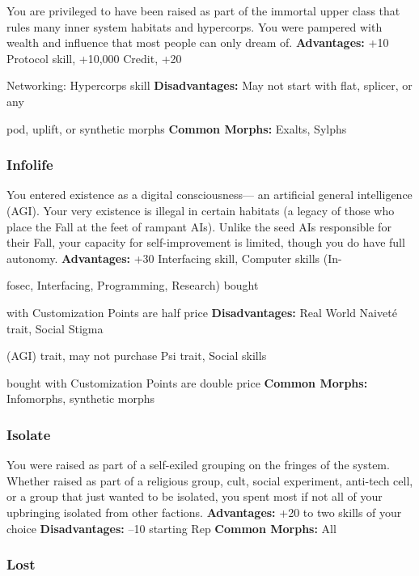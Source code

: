 You are privileged to have been raised as part of the 
immortal upper class that rules many inner system 
habitats and hypercorps. You were pampered with 
wealth and influence that most people can only 
dream of.
\textbf{Advantages:} +10 Protocol skill, +10,000 Credit, +20 

Networking: Hypercorps skill
\textbf{Disadvantages:} May not start with flat, splicer, or any 

pod, uplift, or synthetic morphs
\textbf{Common Morphs:} Exalts, Sylphs

\subsubsection{Infolife}

You entered existence as a digital consciousness—
an artificial general intelligence (AGI). Your very 
existence is illegal in certain habitats (a legacy of 
those who place the Fall at the feet of rampant AIs). 
Unlike the seed AIs responsible for their Fall, your 
capacity for self-improvement is limited, though you 
do have full autonomy.
\textbf{Advantages:} +30 Interfacing skill, Computer skills (In-

fosec, Interfacing, Programming, Research) bought 

with Customization Points are half price
\textbf{Disadvantages:} Real World Naiveté trait, Social Stigma 

(AGI) trait, may not purchase Psi trait, Social skills 

bought with Customization Points are double price
\textbf{Common Morphs:} Infomorphs, synthetic morphs

\subsubsection{Isolate}

You were raised as part of a self-exiled grouping on 
the fringes of the system. Whether raised as part of 
a religious group, cult, social experiment, anti-tech 
cell, or a group that just wanted to be isolated, you 
spent most if not all of your upbringing isolated 
from other factions.
\textbf{Advantages:} +20 to two skills of your choice
\textbf{Disadvantages:} –10 starting Rep
\textbf{Common Morphs:} All

\subsubsection{Lost}

